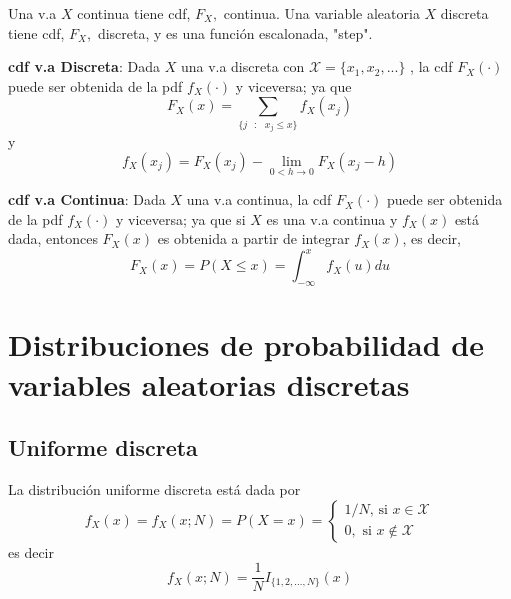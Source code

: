 \vspace{5mm}
Una v.a $X$ continua tiene cdf, $F_{X},$ continua. Una variable aleatoria $X$ discreta tiene cdf, $F_{X},$ discreta, y es una función escalonada, "step".

\vspace{5mm}
\textbf{cdf v.a Discreta}: Dada $X$ una v.a discreta con $\mathcal{X}=\{x_{1},x_{2},...\}$ , la cdf $F_{X}(\cdot )$ puede ser obtenida de la pdf $f_{X}(\cdot )$ y viceversa; ya que 
\begin{equation*}
F_{X}(x)=\sum_{\{j\text{ }:\text{ }x_{j}\leq x\}}f_{X}(x_{j})
\end{equation*}
y 
\begin{equation*}
f_{X}(x_{j})=F_{X}(x_{j})-\lim_{0<h\rightarrow 0}F_{X}(x_{j}-h)
\end{equation*}

\textbf{cdf v.a Continua}: Dada $X$ una v.a continua, la cdf $F_{X}(\cdot )$ puede ser obtenida de la pdf $f_{X}(\cdot )$ y viceversa; ya que si $X$ es una v.a continua y $f_{X}(x)$ está dada, entonces $F_{X}(x)$ es obtenida a partir de integrar $f_{X}(x)$, es decir,
\begin{equation*}
F_{X}(x)=P(X\leq x)=\int_{-\infty }^{x}f_{X}(u)du
\end{equation*}


\section{Distribuciones de probabilidad de variables aleatorias discretas}

\subsection{Uniforme discreta}

\begin{definition}
La distribución uniforme discreta está dada por 
\begin{equation*}
f_{X}(x)=f_{X}(x;N)=P(X=x)=\left\{ 
\begin{array}{l}
1/N\text{, si }x\in \mathcal{X} \\ 
0,\text{ si }x\notin \mathcal{X}
\end{array}
\right.
\end{equation*}
es decir 
\begin{equation*}
f_{X}(x;N)=\frac{1}{N}I_{\{1,2,...,N\}}(x)
\end{equation*}
\end{definition}


